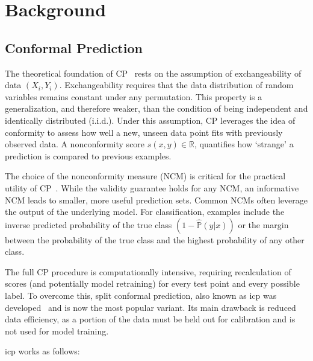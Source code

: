 \chapter{Background}
\label{ch:background}

\section{Conformal Prediction}

The theoretical foundation of CP~\cite{vovk2005algorithmic}
rests on the assumption of exchangeability of data \((X_i,Y_i)\).
Exchangeability requires that the data distribution of random variables
remains constant under any permutation.
This property is a generalization, and therefore weaker,
than the condition of being independent and identically distributed (i.i.d.).
Under this assumption, CP leverages the idea of conformity to assess
how well a new, unseen data point fits with previously observed data.
A nonconformity score \(s(x, y) \in \mathbb{R}\),
quantifies how `strange' a prediction is compared to previous examples.

The choice of the nonconformity measure (NCM) is critical
for the practical utility of CP~\cite{kato2023measures}.
While the validity guarantee holds for any NCM,
an informative NCM leads to smaller, more useful prediction sets.
Common NCMs often leverage the output of the underlying model.
For classification, examples include
the inverse predicted probability of the true class \((1 - \hat{\mathbb{P}}(y | x))\)
or the margin between the probability of the true class
and the highest probability of any other class.

The full CP procedure is computationally intensive,
requiring recalculation of scores (and potentially model retraining)
for every test point and every possible label.
To overcome this, split conformal prediction, also known as \gls{icp}
was developed~\cite{papadopoulos2002inductive} and is now the most popular variant.
Its main drawback is reduced data efficiency, as a portion of the data
must be held out for calibration and is not used for model training.

\gls{icp} works as follows:

